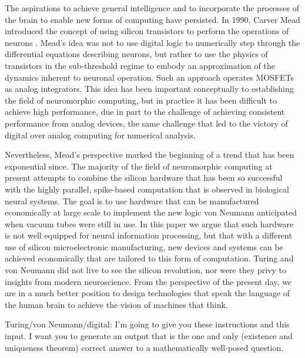\documentclass[twocolumn]{article}
\begin{document}
The aspirations to achieve general intelligence and to incorporate the processes of the brain to enable new forms of computing have persisted. In 1990, Carver Mead introduced the concept of using silicon transistors to perform the operations of neurons \cite{me1990}. Mead's idea was not to use digital logic to numerically step through the differential equations describing neurons, but rather to use the physics of transistors in the sub-threshold regime to embody an approximation of the dynamics inherent to neuronal operation. Such an approach operates MOSFETs as analog integrators. This idea has been important conceptually to establishing the field of neuromorphic computing, but in practice it has been difficult to achieve high performance, due in part to the challenge of achieving consistent performance from analog devices, the same challenge that led to the victory of digital over analog computing for numerical analysis. 

Nevertheless, Mead's perspective marked the beginning of a trend that has been exponential since. The majority of the field of neuromorphic computing at present attempts to combine the silicon hardware that has been so successful with the highly parallel, spike-based computation that is observed in biological neural systems. The goal is to use hardware that can be manufactured economically at large scale to implement the new logic von Neumann anticipated when vacuum tubes were still in use. In this paper we argue that such hardware is not well equipped for neural information processing, but that with a different use of silicon microelectronic manufacturing, new devices and systems can be achieved economically that are tailored to this form of computation. Turing and von Neumann did not live to see the silicon revolution, nor were they privy to insights from modern neuroscience. From the perspective of the present day, we are in a much better position to design technologies that speak the language of the human brain to achieve the vision of machines that think.

 
\vspace{4em}
Turing/von Neumann/digital: I'm going to give you these instructions and this input. I want you to generate an output that is the one and only (existence and uniqueness theorem) correct answer to a mathematically well-posed question.
\end{document}
